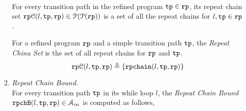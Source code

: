 \begin{enumerate}
\begin{enumerate}
\\
For every transition path in the refined program $\mathtt{tp} \in \mathtt{rp}$, 
its repeat chain set 
$\mathtt{rp}\mathcal{C}(l, \mathtt{tp}, \mathtt{rp}) \in \mathcal{P}(\mathcal{P}(\mathtt{rp}))$
 is a set of all the repeat chains for $l, \mathtt{tp} \in \mathtt{rp}$.
%
\begin{defn}
  \label{def:repeatchainset}
  For a refined program $\mathtt{rp}$ and a simple transition path $\mathtt{tp}$, the \emph{Repeat China Set} is the set of 
  all repeat chains for $\mathtt{rp}$ and $\mathtt{tp}$.
  \[
    \rpchset(l, \tpath, \rprog) \triangleq \left\{\rpch(l, \tpath, \rprog) \right\}
 \]
\end{defn}
\item  \emph{Repeat Chain Bound}.
\\
For every transition path $\mathtt{tp}$
in its  while loop $l$,
the \emph{Repeat Chain Bound} $\mathtt{rpchB}(l, \mathtt{tp}, \mathtt{rp}) \in \mathcal{A}_{in}$ is computed as follows,

\end{enumerate}
\end{enumerate}
